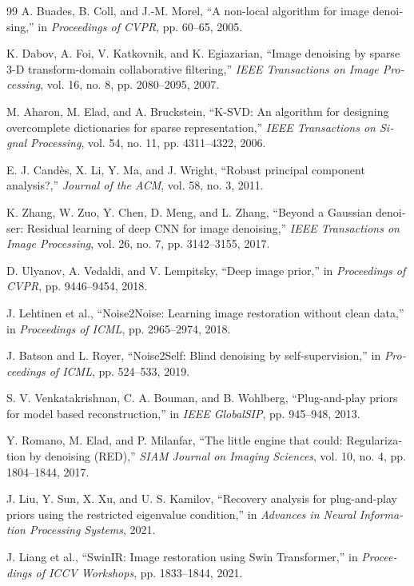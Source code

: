 \documentclass[12pt,openany,oneside]{book}
\begin{document}
\begin{latin}
\begin{thebibliography}{99}
A. Buades, B. Coll, and J.-M. Morel,
``A non-local algorithm for image denoising,''
in \textit{Proceedings of CVPR}, pp. 60--65, 2005.

K. Dabov, A. Foi, V. Katkovnik, and K. Egiazarian,
``Image denoising by sparse 3-D transform-domain collaborative filtering,''
\textit{IEEE Transactions on Image Processing}, vol. 16, no. 8, pp. 2080--2095, 2007.

M. Aharon, M. Elad, and A. Bruckstein,
``K-SVD: An algorithm for designing overcomplete dictionaries for sparse representation,''
\textit{IEEE Transactions on Signal Processing}, vol. 54, no. 11, pp. 4311--4322, 2006.

E. J. Candès, X. Li, Y. Ma, and J. Wright,
``Robust principal component analysis?,''
\textit{Journal of the ACM}, vol. 58, no. 3, 2011.

K. Zhang, W. Zuo, Y. Chen, D. Meng, and L. Zhang,
``Beyond a Gaussian denoiser: Residual learning of deep CNN for image denoising,''
\textit{IEEE Transactions on Image Processing}, vol. 26, no. 7, pp. 3142--3155, 2017.

D. Ulyanov, A. Vedaldi, and V. Lempitsky,
``Deep image prior,''
in \textit{Proceedings of CVPR}, pp. 9446--9454, 2018.

J. Lehtinen et al.,
``Noise2Noise: Learning image restoration without clean data,''
in \textit{Proceedings of ICML}, pp. 2965--2974, 2018.

J. Batson and L. Royer,
``Noise2Self: Blind denoising by self-supervision,''
in \textit{Proceedings of ICML}, pp. 524--533, 2019.

S. V. Venkatakrishnan, C. A. Bouman, and B. Wohlberg,
``Plug-and-play priors for model based reconstruction,''
in \textit{IEEE GlobalSIP}, pp. 945--948, 2013.

Y. Romano, M. Elad, and P. Milanfar,
``The little engine that could: Regularization by denoising (RED),''
\textit{SIAM Journal on Imaging Sciences}, vol. 10, no. 4, pp. 1804--1844, 2017.

J. Liu, Y. Sun, X. Xu, and U. S. Kamilov,
``Recovery analysis for plug-and-play priors using the restricted eigenvalue condition,''
in \textit{Advances in Neural Information Processing Systems}, 2021.

J. Liang et al.,
``SwinIR: Image restoration using Swin Transformer,''
in \textit{Proceedings of ICCV Workshops}, pp. 1833--1844, 2021.


\end{thebibliography}
\end{latin}
\end{document}
